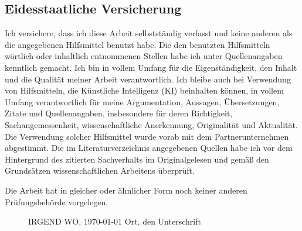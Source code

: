 \documentclass[12pt, oneside]{article}  		%
\begin{document}
\begin{spacing}{1.5}
\section{Eidesstaatliche Versicherung}
Ich versichere, dass ich diese Arbeit selbstständig verfasst und keine anderen als die angegebenen Hilfsmittel benutzt habe. Die den benutzten Hilfsmitteln wörtlich oder inhaltlich entnommenen Stellen habe ich unter Quellenangaben kenntlich gemacht. Ich bin in vollem Umfang für die Eigenständigkeit, den Inhalt und die Qualität meiner Arbeit verantwortlich. Ich bleibe auch bei Verwendung von Hilfsmitteln, die Künstliche Intelligenz (KI) beinhalten können, in vollem Umfang verantwortlich für meine Argumentation, Aussagen, Übersetzungen, Zitate und Quellenangaben, insbesondere für deren Richtigkeit, Sachangemessenheit, wissenschaftliche Anerkennung, Originalität und Aktualität. Die Verwendung solcher Hilfsmittel wurde vorab mit dem Partnerunternehmen abgestimmt. Die im Literaturverzeichnis angegebenen Quellen habe ich vor dem Hintergrund des zitierten Sachverhalts im Originalgelesen und gemäß den Grundsätzen wissenschaftlichen Arbeitens überprüft. 

Die Arbeit hat in gleicher oder ähnlicher Form noch keiner anderen Prüfungsbehörde vorgelegen.
\par \vspace{1cm}
\begin{figure}[H]
	IRGEND WO, \today
	\hspace{3.6cm}
	Ort, den Unterschrift
\end{figure}

\end{spacing}
\end{document}
